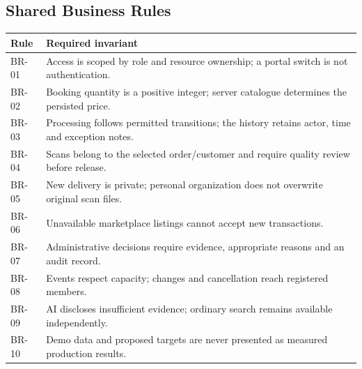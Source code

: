 \subsection{Shared Business Rules}
\begin{longtable}{p{}p{}}
\toprule\textbf{Rule} & \textbf{Required invariant}\\\midrule\endhead
BR-01 & Access is scoped by role and resource ownership; a portal switch is not authentication.\\
BR-02 & Booking quantity is a positive integer; server catalogue determines the persisted price.\\
BR-03 & Processing follows permitted transitions; the history retains actor, time and exception notes.\\
BR-04 & Scans belong to the selected order/customer and require quality review before release.\\
BR-05 & New delivery is private; personal organization does not overwrite original scan files.\\
BR-06 & Unavailable marketplace listings cannot accept new transactions.\\
BR-07 & Administrative decisions require evidence, appropriate reasons and an audit record.\\
BR-08 & Events respect capacity; changes and cancellation reach registered members.\\
BR-09 & AI discloses insufficient evidence; ordinary search remains available independently.\\
BR-10 & Demo data and proposed targets are never presented as measured production results.\\
\bottomrule
\end{longtable}
